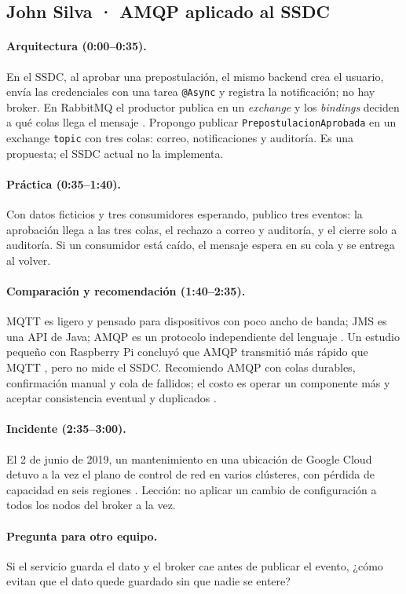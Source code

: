 
\subsection{John Silva · AMQP aplicado al SSDC}

\paragraph{Arquitectura (0:00--0:35).}
En el SSDC, al aprobar una prepostulación, el mismo backend crea el usuario, envía las credenciales con una tarea \texttt{@Async} y registra la notificación; no hay broker. En RabbitMQ el productor publica en un \emph{exchange} y los \emph{bindings} deciden a qué colas llega el mensaje \cite{rabbitmq_concepts}. Propongo publicar \texttt{PrepostulacionAprobada} en un exchange \texttt{topic} con tres colas: correo, notificaciones y auditoría. Es una propuesta; el SSDC actual no la implementa.

\paragraph{Práctica (0:35--1:40).}
Con datos ficticios y tres consumidores esperando, publico tres eventos: la aprobación llega a las tres colas, el rechazo a correo y auditoría, y el cierre solo a auditoría. Si un consumidor está caído, el mensaje espera en su cola y se entrega al volver.

\paragraph{Comparación y recomendación (1:40--2:35).}
MQTT es ligero y pensado para dispositivos con poco ancho de banda; JMS es una API de Java; AMQP es un protocolo independiente del lenguaje \cite{oasis2012}. Un estudio pequeño con Raspberry Pi concluyó que AMQP transmitió más rápido que MQTT \cite{gultunca2018}, pero no mide el SSDC. Recomiendo AMQP con colas durables, confirmación manual y cola de fallidos; el costo es operar un componente más y aceptar consistencia eventual y duplicados \cite{maharjan2023}.

\paragraph{Incidente (2:35--3:00).}
El 2 de junio de 2019, un mantenimiento en una ubicación de Google Cloud detuvo a la vez el plano de control de red en varios clústeres, con pérdida de capacidad en seis regiones \cite{googlecloud19009}. Lección: no aplicar un cambio de configuración a todos los nodos del broker a la vez.

\paragraph{Pregunta para otro equipo.}
Si el servicio guarda el dato y el broker cae antes de publicar el evento, ¿cómo evitan que el dato quede guardado sin que nadie se entere?
